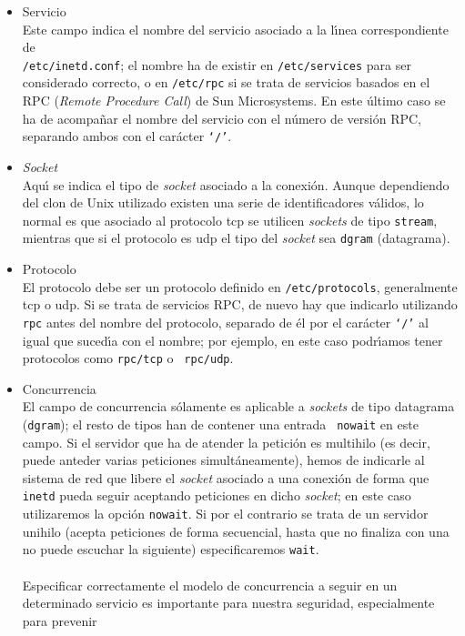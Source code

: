 \begin{itemize}
\item Servicio\\
Este campo indica el nombre del servicio asociado a la l\'{\i}nea 
correspondiente de {\tt\\ /etc/inetd.conf}; el nombre ha de existir en 
{\tt /etc/services} para ser considerado correcto, o en {\tt /etc/rpc} si se
trata de servicios basados en el RPC ({\it Remote Procedure Call}) de Sun
Microsystems. En este \'ultimo caso se ha de acompa\~nar el nombre del servicio
con el n\'umero de versi\'on RPC, separando ambos con el car\'acter {\tt `/'}.
\item {\it Socket}\\
Aqu\'{\i} se indica el tipo de {\it socket} asociado a la conexi\'on. Aunque
dependiendo del clon de Unix utilizado existen una serie de identificadores 
v\'alidos, lo normal es que asociado al protocolo {\sc tcp} se utilicen 
{\it sockets} de tipo {\tt stream}, mientras que si el protocolo es {\sc udp} 
el tipo del {\it socket} sea {\tt dgram} (datagrama).
\item Protocolo\\
El protocolo debe ser un protocolo definido en {\tt /etc/protocols}, 
generalmente {\sc tcp} o {\sc udp}. Si se trata de servicios RPC, de nuevo hay
que indicarlo utilizando {\tt rpc} antes del nombre del protocolo, separado
de \'el por el car\'acter {\tt `/'} al igual que suced\'{\i}a con el nombre; por
ejemplo, en este caso podr\'{\i}amos tener protocolos como {\tt rpc/tcp} o {\tt
rpc/udp}.
\item Concurrencia\\
El campo de concurrencia s\'olamente es aplicable a {\it sockets} de tipo
datagrama ({\tt dgram}); el resto de tipos han de contener una entrada {\tt
nowait} en este campo. Si el servidor que ha de atender la petici\'on es
multihilo (es decir, puede anteder varias peticiones simult\'aneamente), hemos
de indicarle al sistema de red que libere el {\it socket} asociado a una 
conexi\'on de forma que {\tt inetd} pueda seguir aceptando peticiones en dicho
{\it socket}; en este caso utilizaremos la opci\'on {\tt nowait}. Si por el
contrario se trata de un servidor unihilo (acepta peticiones de forma 
secuencial, hasta que no finaliza con una no puede escuchar la siguiente) 
especificaremos {\tt wait}.\\
\\Especificar correctamente el modelo de concurrencia a seguir en un determinado
servicio es importante para nuestra seguridad, especialmente para prevenir

\end{itemize}
